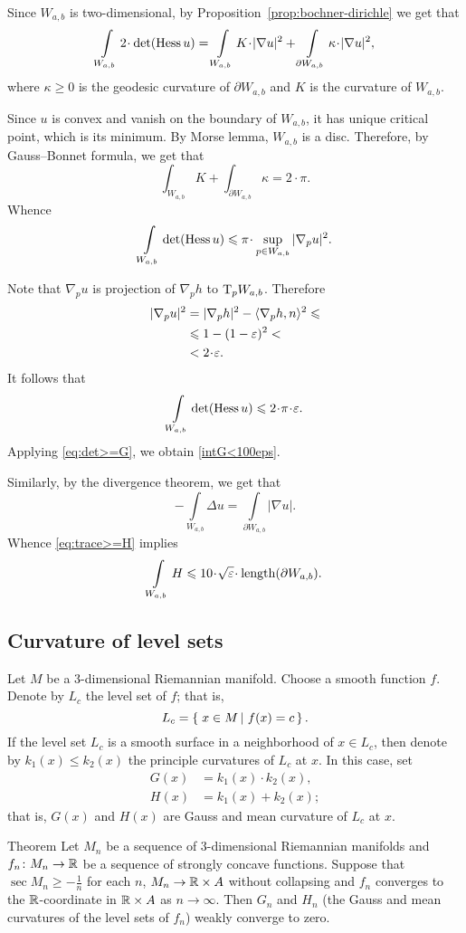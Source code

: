Since $W_{a,b}$ is two-dimensional, by Proposition~\ref{prop:bochner-dirichle} we get that
\[\int\limits_{W_{a,b}} 
2\cdot\det(\Hess u)
=\int\limits_{W_{a,b}} 
K\cdot|\nabla u|^2
+
\int\limits_{\partial W_{a,b}}
\kappa\cdot|\nabla u|^2,\]
where $\kappa\ge 0$ is the geodesic curvature of $\partial W_{a,b}$
and $K$ is the curvature of $W_{a,b}$.

Since $u$ is convex and vanish on the boundary of $W_{a,b}$,
it has unique critical point, which is its minimum.
By Morse lemma,  $W_{a,b}$ is a disc.
Therefore, by Gauss--Bonnet formula, we get that
\[\int_{W_{a,b}} K+\int_{\partial{W_{a,b}}}\kappa=2\cdot\pi.\]
Whence 
\[\int\limits_{W_{a,b}} 
\det(\Hess u)
\le\pi\cdot\sup_{p\in{W_{a,b}}}|\nabla_p u|^2.\]

Note that $\nabla_p u$ is projection of $\nabla_ph$ to $\mathrm{T}_pW_{a,b}$.
Therefore
\begin{align*}
|\nabla_p u|^2&=|\nabla_p h|^2-\langle\nabla_p h,n\rangle^2\le
\\
&\le1-(1-\eps)^2<
\\
&<2\cdot\eps.
\end{align*}
It follows that 
\[\int\limits_{W_{a,b}} 
\det(\Hess u)
\le2\cdot \pi\cdot\eps.\]
Applying \ref{eq:det>=G}, we obtain \ref{intG<100eps}.

Similarly,  by the divergence theorem, we get that
\[-\int\limits_{W_{a,b}} \Delta u=\int\limits_{\partial{W_{a,b}}} |\nabla u|.\]
Whence \ref{eq:trace>=H} implies 
\[\int\limits_{W_{a,b}} H\le 10\cdot \sqrt{\eps}\cdot \length(\partial{W_{a,b}}).\]
\qeds

\subsection{Curvature of level sets}

Let $M$ be a 3-dimensional Riemannian manifold.
Choose a smooth function $f$.
Denote by $L_c$ the level set of $f$;
that is,
\[L_c=\set{x\in M}{f(x)=c}.\]
If the level set $L_c$ is a smooth surface in a neighborhood of $x\in L_c$,
then denote by $k_1(x)\le k_2(x)$ the principle curvatures of $L_c$ at $x$.
In this case, set 
\begin{align*}
G(x)&=k_1(x)\cdot k_2(x),
\\
H(x)&=k_1(x)+ k_2(x);
\end{align*}
that is, $G(x)$ and $H(x)$ are Gauss and mean curvature of $L_c$ at $x$.

\begin{thm}{Theorem}\label{thm:HG-converge}
Let $M_n$ be a sequence of $3$-dimensional Riemannian manifolds
and $f_n\colon M_n\to \mathbb{R}$ be a sequence of strongly concave functions.
Suppose that $\sec M_n\ge -\tfrac1n$ for each $n$, $M_n\zz\to \RR\times A$ without collapsing and $f_n$ converges to the $\mathbb{R}$-coordinate in $\mathbb{R}\times A$ as $n\to \infty$.
Then $G_n$ and $H_n$ (the Gauss and mean curvatures of the level sets of $f_n$) weakly converge to zero.
\end{thm}

